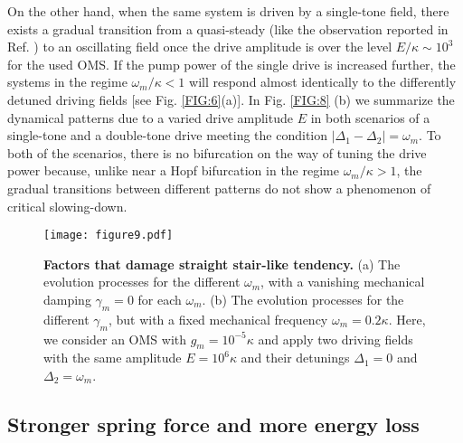 \documentclass[a4paper,fleqn]{cas-dc}
\begin{document}
On the other hand, when the same system is driven by a single-tone field, there exists a gradual transition from a quasi-steady (like the observation reported in Ref. \cite{doolin2014nonlinear}) to an oscillating field once the drive amplitude is over the level $E/\kappa\sim10^3$ for the used OMS. If the pump power of the single drive is increased further, the systems in the regime $\omega_m/\kappa<1$ will respond almost identically to the differently detuned driving fields [see Fig. \ref{FIG:6}(a)]. In Fig. \ref{FIG:8} (b) we summarize the dynamical patterns due to a varied drive amplitude $E$ in both scenarios of a single-tone and a double-tone drive meeting the condition $|\Delta_1-\Delta_2|=\omega_m$. To both of the scenarios, there is no bifurcation on the way of tuning the drive power because, unlike near a Hopf bifurcation in the regime $\omega_m/\kappa>1$, the gradual transitions between different patterns do not show a phenomenon of critical slowing-down. 

\begin{figure}
	\centering
		\texttt{[image: figure9.pdf]}
	\caption{{\bf Factors that damage straight stair-like tendency.} (a) The evolution processes for the different $\omega_m$, with a vanishing mechanical damping $\gamma_m=0$ for each $\omega_m$. (b) The evolution processes 
for the different $\gamma_m$, but with a fixed mechanical frequency $\omega_m=0.2\kappa$. Here, we consider an OMS with $g_m=10^{-5}\kappa$ and apply two driving fields with the same amplitude $E=10^6\kappa$ and their detunings $\Delta_1=0$ and $\Delta_2=\omega_m$. }
	\label{FIG:9}
\end{figure}

\subsection{Stronger spring force and more energy loss}
\end{document}
